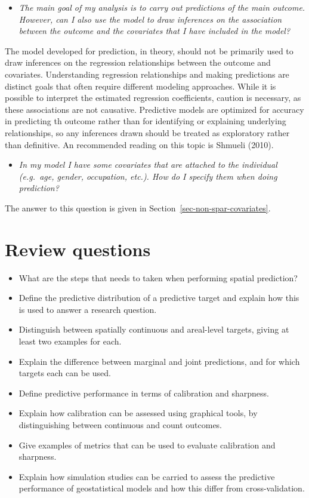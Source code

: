 \documentclass[
  letterpaper,
]{krantz}
\providecommand{\tightlist}{%
  \setlength{\itemsep}{0pt}\setlength{\parskip}{0pt}}
\begin{document}
\begin{itemize}
\tightlist
\item
  \emph{The main goal of my analysis is to carry out predictions of the
  main outcome. However, can I also use the model to draw inferences on
  the association between the outcome and the covariates that I have
  included in the model?}
\end{itemize}

The model developed for prediction, in theory, should not be primarily
used to draw inferences on the regression relationships between the
outcome and covariates. Understanding regression relationships and
making predictions are distinct goals that often require different
modeling approaches. While it is possible to interpret the estimated
regression coefficients, caution is necessary, as these associations are
not causative. Predictive models are optimized for accuracy in
predicting th outcome rather than for identifying or explaining
underlying relationships, so any inferences drawn should be treated as
exploratory rather than definitive. An recommended reading on this topic
is Shmueli (2010).

\begin{itemize}
\tightlist
\item
  \emph{In my model I have some covariates that are attached to the
  individual (e.g.~age, gender, occupation, etc.). How do I specify them
  when doing prediction?}
\end{itemize}

The answer to this question is given in
Section~\ref{sec-non-spar-covariates}.

\section{Review questions}\label{review-questions-2}

\begin{itemize}
\tightlist
\item
  What are the steps that needs to taken when performing spatial
  prediction?
\item
  Define the predictive distribution of a predictive target and explain
  how this is used to answer a research question.
\item
  Distinguish between spatially continuous and areal-level targets,
  giving at least two examples for each.
\item
  Explain the difference between marginal and joint predictions, and for
  which targets each can be used.
\item
  Define predictive performance in terms of calibration and sharpness.
\item
  Explain how calibration can be assessed using graphical tools, by
  distinguishing between continuous and count outcomes.
\item
  Give examples of metrics that can be used to evaluate calibration and
  sharpness.
\item
  Explain how simulation studies can be carried to assess the predictive
  performance of geostatistical models and how this differ from
  cross-validation.
\end{itemize}
\end{document}
